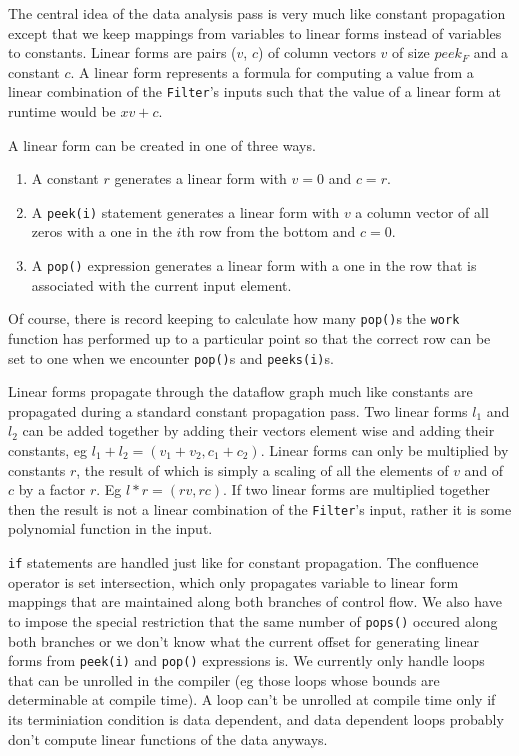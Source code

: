 The central idea of the data analysis pass is very much like constant propagation
except that we keep mappings from variables to linear forms instead of variables to
constants. Linear forms are pairs ($v$, $c$) of column vectors $v$ of size $peek_{F}$ 
and a constant $c$. A linear form represents a formula for computing a value from a
linear combination of the {\tt Filter}'s inputs such that the value of a 
linear form at runtime would be $xv + c$.

A linear form can be created in one of three ways. 
\begin{enumerate}
\item A constant $r$ generates a linear form with $v=0$ and $c=r$. 
\item A {\tt peek(i)} statement generates a linear form with $v$ a column vector of all zeros with 
a one in the $i$th row from the bottom and $c=0$. 
\item A {\tt pop()} expression generates a linear form with a one in the row that is associated with 
the current input element. 
\end{enumerate}

Of course, there is record keeping to calculate how many {\tt pop()}s
the {\tt work} function has performed up to a particular point so that the correct
row can be set to one when we encounter {\tt pop()}s and {\tt peeks(i)}s.

Linear forms propagate through the dataflow graph much like constants are propagated
during a standard constant propagation pass. Two linear forms $l_{1}$ and $l_{2}$ can
be added together by adding their vectors element wise and adding their constants, eg 
$l_1+l_2=(v_1+v_2, c_1+c_2)$. Linear forms can only be multiplied by constants $r$, 
the result of which is simply a scaling of all the elements of $v$ and of $c$ by a factor
$r$. Eg $l*r = (rv,rc)$. If two linear forms are multiplied together 
then the result is not a linear combination of the {\tt Filter}'s input, rather it is
some polynomial function in the input.

{\tt if} statements are handled just like for constant propagation. The confluence operator
is set intersection, which only propagates variable to linear form mappings that are
maintained along both branches of control flow. We also have to impose the special restriction that the
same number of {\tt pops()} occured along both branches or we don't know what the current offset
for generating linear forms from {\tt peek(i)} and {\tt pop()} expressions is. 
We currently only handle loops that can be unrolled in the 
compiler (eg those loops whose bounds are determinable at compile time). 
A loop can't be unrolled at compile time only if its terminiation condition is data 
dependent, and data dependent loops probably don't compute linear 
functions of the data anyways.


